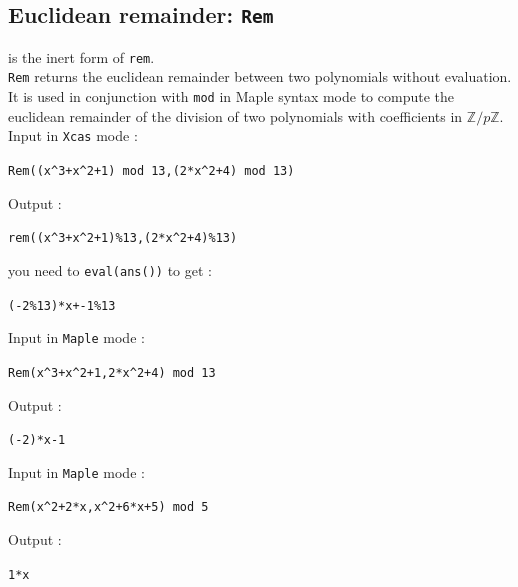 \documentclass[a4paper,11pt]{book}
\newcommand{\Z}{{\mathbb{Z}}}
\begin{document}
\subsection{Euclidean remainder: {\tt Rem}}
 is the inert form of {\tt rem}.\\
{\tt Rem} returns the euclidean remainder between two polynomials
without evaluation. 
It is used in conjunction with {\tt mod} in Maple syntax mode to compute
the euclidean remainder of the division of two
polynomials with coefficients in $\Z/p\Z$.\\
Input in {\tt Xcas} mode :
\begin{center}{\tt Rem((x\verb|^|3+x\verb|^|2+1) mod 13,(2*x\verb|^|2+4) mod 13)}\end{center}
Output :
\begin{center}{\tt rem((x\verb|^|3+x\verb|^|2+1)\%13,(2*x\verb|^|2+4)\%13)}\end{center}
you need to {\tt eval(ans())} to get :
\begin{center}{\tt (-2\%13)*x+-1\%13}\end{center}
Input in {\tt Maple} mode :
\begin{center}{\tt Rem(x\verb|^|3+x\verb|^|2+1,2*x\verb|^|2+4) mod 13}\end{center}
Output :
\begin{center}{\tt (-2)*x-1}\end{center}
Input in {\tt Maple} mode :
\begin{center}{\tt Rem(x\verb|^|2+2*x,x\verb|^|2+6*x+5) mod 5}\end{center}
Output :
\begin{center}{\tt 1*x}\end{center}
\end{document}
